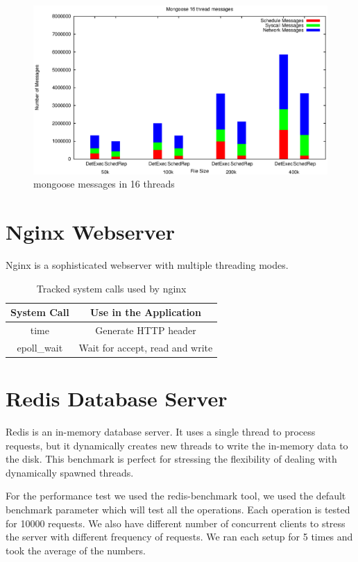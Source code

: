 \begin{figure}
\centering
\includegraphics[width=1\columnwidth]{figures/mg_msg_16}
\caption{mongoose messages in 16 threads}
\label{f:mg_msg_16}
\end{figure}
\section{Nginx Webserver}
Nginx is a sophisticated webserver with multiple threading modes.

\begin{table}
\caption{Tracked system calls used by nginx}
\begin{center}
 \begin{tabular}{c | c }
System Call & Use in the Application\\ \hline
 time & Generate HTTP header\\ \hline
 epoll\_wait & Wait for accept, read and write
 \end{tabular}
\end{center}
\label{t:nginx_syscall}
\end{table}

\section{Redis Database Server}
Redis is an in-memory database server. It uses a single thread to process requests, but it dynamically creates new threads to write the in-memory data to the disk. This benchmark is perfect for stressing the flexibility of dealing with dynamically spawned threads.

For the performance test we used the redis-benchmark tool, we used the default benchmark parameter which will test all the operations. Each operation is tested for 10000 requests. We also have different number of concurrent clients to stress the server with different frequency of requests. We ran each setup for 5 times and took the average of the numbers.

